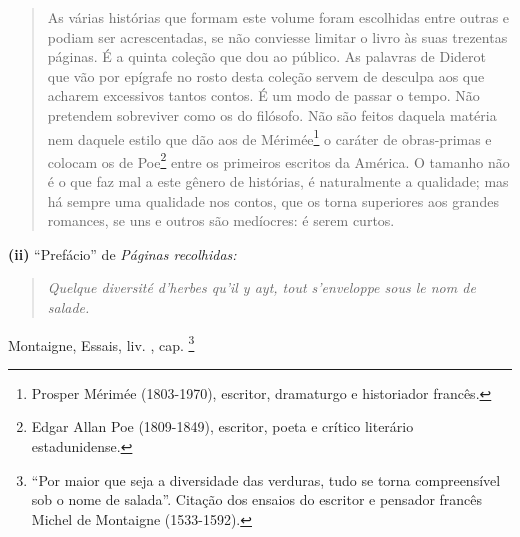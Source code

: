\begin{quote}
As várias histórias que formam este volume foram escolhidas entre outras
e podiam ser acrescentadas, se não conviesse limitar o livro às suas
trezentas páginas. É a quinta coleção que dou ao público. As palavras de
Diderot que vão por epígrafe no rosto desta coleção servem de desculpa
aos que acharem excessivos tantos contos. É um modo de passar o tempo.
Não pretendem sobreviver como os do filósofo. Não são feitos daquela
matéria nem daquele estilo que dão aos de Mérimée\footnote{Prosper
  Mérimée (1803-1970), escritor, dramaturgo e historiador francês.} o
caráter de obras-primas e colocam os de Poe\footnote{Edgar Allan Poe
  (1809-1849), escritor, poeta e crítico literário estadunidense.} entre
os primeiros escritos da América. O tamanho não é o que faz mal a este
gênero de histórias, é naturalmente a qualidade; mas há sempre uma
qualidade nos contos, que os torna superiores aos grandes romances, se
uns e outros são medíocres: é serem curtos.
\end{quote}

\textbf{(ii)} ``Prefácio'' de \emph{Páginas recolhidas: }

\begin{quote}
\emph{Quelque diversité d'herbes qu'il y ayt, tout s'enveloppe sous le
nom de salade. }
\end{quote}

\begin{flushright}
Montaigne, Essais, liv. , cap. \footnote{``Por maior que seja a
  diversidade das verduras, tudo se torna compreensível sob o nome de
  salada''. Citação dos ensaios do escritor e pensador francês Michel de
  Montaigne (1533-1592).}
\end{flushright}

